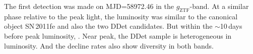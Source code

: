 \documentclass[twocolumn]{aastex631}
\newcommand{\sn}{SN\,2020jgb}
\newcommand{\adam}[1]{\textcolor{red}{[AAM: #1]}}
\newcommand{\chang}[1]{\textcolor{blue}{[Chang: #1]}}
\begin{document}
The first detection was made on MJD=58972.46 in the $g_\mathrm{ZTF}$-band. At a similar phase relative to the peak light, the luminosity was similar to the canonical object SN\,2011fe and also the two DDet candidates. 
But within the $\sim$10\,days before peak luminosity, . %
Near peak, the DDet sample is heterogeneous in luminosity. And the decline rates also show diversity in both bands. %
\end{document}
